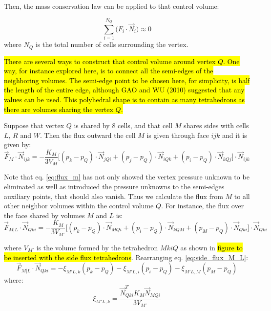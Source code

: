 \documentclass{article}
\begin{document}
Then, the mass conservation law can be applied to that control volume:

\begin{equation} \label{eq:summ_all_flux_around_vertex}
\sum_{i = 1} ^{N_{Q}} \big( F_{i} \cdot \vec{N}_{i} \big) \approx 0
\end{equation}
where $N_{Q}$ is the total number of cells surrounding the vertex.

\hl{There are several ways to construct that control volume around vertex $ Q $. One way, for instance explored here, is to connect all the semi-edges of the neighboring volumes. The semi-edge point to be chosen here, for simplicity, is half the length of the entire edge, although GAO and WU (2010) suggested that any values can be used.
This polyhedral shape is to contain as many tetrahedrons as there are volumes sharing the vertex $ Q $.}

Suppose that vertex $ Q $ is shared by 8 cells, and that cell $ M $  shares sides with cells $L $, $ R $ and $ W $. Then the flux outward the cell $ M $ is given through face $ ijk $ and it is given by:
\begin{equation} \label{eq:flux_m}
\vec{F}_{M} \cdot \vec{N}_{ijk} = - \frac{K_{M}}{3V_{M}} \bigg[(p_{k} - p_{Q}) \cdot \vec{N}_{jQi} + (p_{j} - p_{Q}) \cdot \vec{N}_{iQk} + (p_{i} - p_{Q}) \cdot \vec{N}_{kQj} \bigg] \cdot \vec{N}_{ijk}
\end{equation}

Note that eq. \ref{eq:flux_m} has not only showed the vertex pressure unknown to be eliminated as well as introduced the pressure unknowns to the semi-edges auxiliary points, that should also vanish. Thus we calculate the flux from $ M $ to all other neighbor volumes within the control volume $ Q $. For instance, the flux over the face shared by volumes $ M $ and $ L $ is:
\begin{equation} \label{eq:side_flux_M_L}
\vec{F}_{M|L} \cdot \vec{N}_{Qki} = - \frac{K_{M}}{3V_{M'}} \bigg[(p_{k} - p_{Q}) \cdot \vec{N}_{MQi} + (p_{i} - p_{Q}) \cdot \vec{N}_{kQM} + (p_{M} - p_{Q}) \cdot \vec{N}_{Qki} \bigg] \cdot \vec{N}_{Qki}
\end{equation}

where $ V_{M'} $ is the volume formed by the tetrahedron $ MkiQ $ as shown in \hl{figure to be inserted with the side flux tetrahedrons}. Rearranging eq. \ref{eq:side_flux_M_L}:
\begin{equation} \label{eq:side_flux_M_L_rearranged}
\vec{F}_{M|L} \cdot \vec{N}_{Qki} = -\xi_{M'L,k}(p_{k} - p_{Q}) - \xi_{M'L,i}(p_{i} - p_{Q}) - \xi_{M'L,M}(p_{M} - p_{Q})
\end{equation}
where:
\begin{displaymath}
	\xi_{M'L,k} = \frac{\vec{N}^{T}_{Qki} K_{M} \vec{N}_{MQi}}{3V_{M'}}
\end{displaymath}
\end{document}
